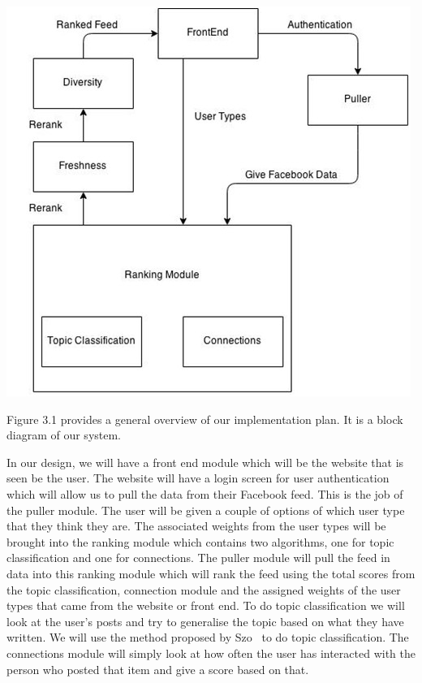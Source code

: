 \begin{center}
  \includegraphics[scale=0.6]{images/blockdiagram.jpg}
\end{center}

Figure 3.1 provides a general overview of our implementation plan. It is a block diagram of our system. 

In our design, we will have a front end module which will be the website that is seen be the user. The website will have a login screen for user authentication which will allow us to pull the data from their Facebook feed. This is the job of the puller module.  The user will be given a couple of options of which user type that they think they are. The associated weights from the user types will be brought into the ranking module which contains two algorithms, one for topic classification and one for connections. The puller module will pull the feed in data into this ranking module which will rank the feed using the total scores from the topic classification, connection module and the assigned weights of the user types that came from the website or front end. To do topic classification we will look at the user's posts and try to generalise the topic based on what they have written. We will use the method proposed by Szo~\cite{szomszor2008semantic} to do topic classification.
The connections module will simply look at how often the user has interacted with the person who posted that item and give a score based on that. 

